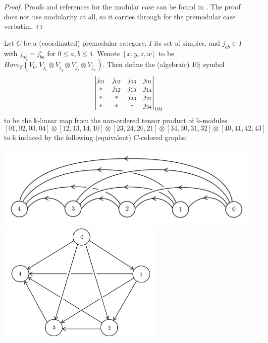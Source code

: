 \begin{proof}
  Proofs and references for the modular case can be found in
  \cite[section VI.5.4]{turaev-qiok-3-manifolds}. The proof does
  not use modularity at all, so it carries through for the
  premodular case verbatim.
\end{proof}

\begin{definition}[$10$j-symbol]\label{def/10j-symbol}
  Let $C$ be a (coordinated) premodular category, $I$ its set of
  simples, and $j_{ab} \in I$ with $j_{ab} = j_{ba}^{\star}$ for
  $0 \leq a, b \leq 4$.
  Wenote $[x,y,z,w]$ to be
  $Hom_{Z}(V_{0}, V_{j_{x}} \otimes V_{j_{y}} \otimes V_{j_{z}} \otimes V_{j_{w}})$.
  Then define the (algebraic) $10$j symbol
  $$
  \begin{vmatrix} j_{01} & j_{02} & j_{03} & j_{04} \\ * & j_{12} & j_{13} & j_{14} \\ * & * & j_{23} & j_{24} \\ * & * & * & j_{34} \\ \end{vmatrix}_{10j}
  $$
  to be the $\mathbb{k}$-linear map from the non-ordered tensor
  product of $\mathbb{k}$-modules
  $$
  [01,02,03,04] \otimes
  [12,13,14,10] \otimes
  [23,24,20,21] \otimes
  [34,30,31,32] \otimes
  [40,41,42,43]
  $$
  to $\mathbb{k}$ induced by the following (equivalent)
  $C$-colored graphs:
  \begin{center}
    \includegraphics[height=4cm]{10j-plain}
    \includegraphics[height=6cm]{10j-geometric}
  \end{center}
\end{definition}

